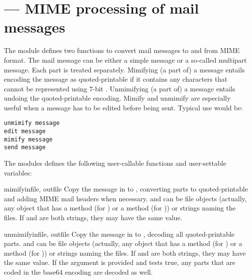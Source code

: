 \section{ ---
         MIME processing of mail messages}



The  module defines two functions to convert mail messages to
and from MIME format.  The mail message can be either a simple message
or a so-called multipart message.  Each part is treated separately.
Mimifying (a part of) a message entails encoding the message as
quoted-printable if it contains any characters that cannot be
represented using 7-bit \ASCII.  Unmimifying (a part of) a message
entails undoing the quoted-printable encoding.  Mimify and unmimify
are especially useful when a message has to be edited before being
sent.  Typical use would be:

\begin{verbatim}
unmimify message
edit message
mimify message
send message
\end{verbatim}

The modules defines the following user-callable functions and
user-settable variables:

\begin{funcdesc}{mimify}{infile, outfile}
Copy the message in  to , converting parts to
quoted-printable and adding MIME mail headers when necessary.
 and  can be file objects (actually, any
object that has a  method (for ) or a
 method (for )) or strings naming the files.
If  and  are both strings, they may have the
same value.
\end{funcdesc}

\begin{funcdesc}{unmimify}{infile, outfile}
Copy the message in  to , decoding all
quoted-printable parts.   and  can be file
objects (actually, any object that has a  method (for
) or a  method (for )) or strings
naming the files.  If  and  are both strings,
they may have the same value.
If the  argument is provided and tests true, any
parts that are coded in the base64 encoding are decoded as well.
\end{funcdesc}

